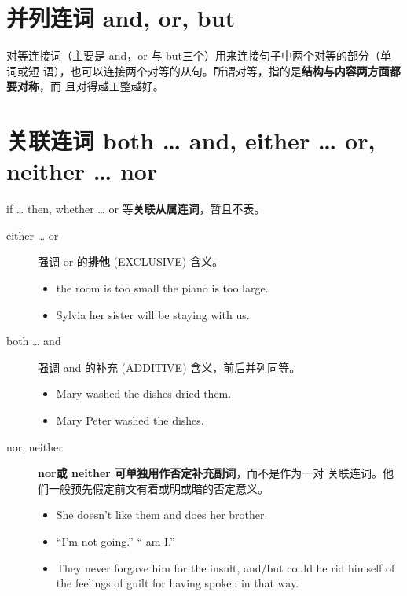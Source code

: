 \section{并列连词 and, or, but}

对等连接词（主要是 and，or 与 but三个）用来连接句子中两个对等的部分（单词或短
语），也可以连接两个对等的从句。所谓对等，指的是\textbf{结构与内容两方面都要对称}，而
且对得越工整越好。

\section{关联连词 both \ldots{} and, either \ldots{} or, neither \ldots{}
  nor}

if \ldots{} then, whether \ldots{} or 等\textbf{关联从属连词}，暂且不表。

\begin{description}
\item[either \ldots{} or] 强调 or 的\textbf{排他} (EXCLUSIVE) 含义。
  \begin{itemize}
  \item {} the room is too small  the piano is too large.

  \item {} Sylvia  her sister will be staying with us.
  \end{itemize}

\item[both \ldots{} and] 强调 and 的补充 (ADDITIVE) 含义，前后并列同等。
  \begin{itemize}
  \item Mary  washed the dishes  dried them.

  \item {} Mary  Peter washed the dishes.
  \end{itemize}

\item[nor, neither] \textbf{nor或 neither 可单独用作否定补充副词}，而不是作为一对
  关联连词。他们一般预先假定前文有着或明或暗的否定意义。
  \begin{itemize}
  \item She doesn't like them and  does her brother.

  \item ``I'm not going.'' `` am I.''
  \item They never forgave him for the insult, and/but  could he rid
    himself of the feelings of guilt for having spoken in that way.
  \end{itemize}



\end{description}
